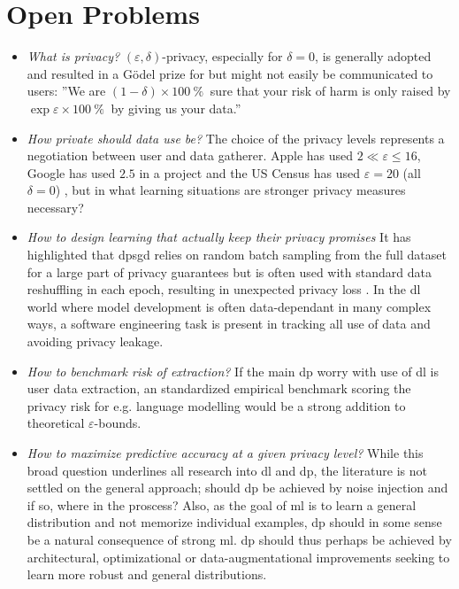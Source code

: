\documentclass[12pt,fleqn,twocolumn]{article}
\newcommand{\pro}{\ensuremath{\:\%{}\:}}
\begin{document}
\section*{Open Problems}%
\label{sec:Open Problems}
\begin{itemize}
    \item \emph{What is privacy?} 
      $(\varepsilon, \delta)$-privacy, especially for $\delta=0$, is generally adopted and resulted in a Gödel prize for \textcite{dwork2006cali} but might not easily be communicated to users: ''We are $(1-\delta)\times 100\pro$ sure that your risk of harm is only raised by $\exp{\varepsilon}\times 100\pro$ by giving us your data.''
    \item \emph{How private should data use be?} 
        The choice of the privacy levels represents a negotiation between user and data gatherer.
        Apple has used $2 \ll \varepsilon \le 16$, Google has used $2.5$ in a project and the US Census has used $\varepsilon=20$ (all $\delta=0$) \cite{near2022priv}, but in what learning situations are stronger privacy measures necessary?
    \item  \emph{How to design learning that actually keep their privacy promises}
        It has highlighted that \acrshort{dpsgd} relies on random batch sampling from the full dataset for a large part of privacy guarantees but is often used with standard data reshuffling in each epoch, resulting in unexpected privacy loss \cite[III]{Yu2019DifferentiallyPM}.
        In the \acrshort{dl} world where model development is often data-dependant in many complex ways, a software engineering task is present in tracking all use of data and avoiding privacy leakage.
    \item \emph{How to benchmark risk of extraction?}
        If the main \acrshort{dp} worry with use of \acrshort{dl} is user data extraction, an standardized empirical benchmark scoring the privacy risk for e.g. language modelling would be a strong addition to theoretical $\varepsilon$-bounds.
    \item \emph{How to maximize predictive accuracy at a given privacy level?}
        While this broad question underlines all research into \acrshort{dl} and \acrshort{dp}, the literature is not settled on the general approach; should \acrshort{dp} be achieved by noise injection and if so, where in the proscess?
        Also, as the goal of \acrshort{ml} is to learn a general distribution and not memorize individual examples, \acrshort{dp} should in some sense be a natural consequence of strong \acrshort{ml}.
        \acrshort{dp} should thus perhaps be achieved by architectural, optimizational or data-augmentational improvements seeking to learn more robust and general distributions.
\end{itemize}
\clearpage
\renewcommand*{\bibfont}{\normalfont\footnotesize}
\printbibliography[heading=bibintoc]

\printglossary[type=\acronymtype]
\end{document}
